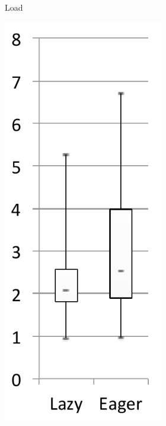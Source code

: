 \documentclass[sigplan,10pt,review,anonymous]{acmart}\settopmatter{printfolios=true,printccs=false,printacmref=false}
\begin{document}
\begin{figure}[bth]
\begin{subfigure}[b]{.48\textwidth}
\begin{subfigure}[b]{.24\textwidth}
    		\caption{Load}
       	\end{subfigure}%
       	\begin{subfigure}[b]{.24\textwidth}
    		\includegraphics[width=\linewidth]{figures/wildflyExp} 

\end{subfigure}
\end{subfigure}
\end{figure}
\end{document}
